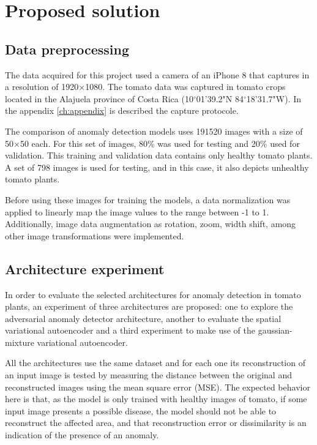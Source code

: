 \chapter{Proposed solution}
\label{ch:solution}

\section{Data preprocessing}

The data acquired for this project used a camera of an iPhone 8 that captures in a resolution of 1920$\times$1080. The tomato data was captured in tomato crops located in the Alajuela province of Costa Rica (10$^{\circ}$01'39.2"N 84$^{\circ}$18'31.7"W). In the appendix \ref{ch:appendix} is described the capture protocole.

The comparison of anomaly detection models uses 191520 images with a size of 50$\times$50 each. For this set of images, 80\% was used for testing and 20\% used for validation. This training and validation data contains only healthy tomato plants. A set of 798 images is used for testing, and in this case, it also depicts unhealthy tomato plants.

Before using these images for training the models, a data normalization was applied to linearly map the image values to the range between -1 to 1. Additionally, image data augmentation as rotation, zoom, width shift, among other image transformations were implemented.

\section{Architecture experiment}

In order to evaluate the selected architectures for anomaly detection in tomato plants, an experiment of three architectures are proposed: one to explore the adversarial anomaly detector architecture, another to evaluate the spatial variational autoencoder and a third experiment to make use of the gaussian-mixture variational autoencoder.

All the architectures use the same dataset and for each one its reconstruction of an input image is tested by measuring the distance between the original and reconstructed images using the mean square error (MSE). The expected behavior here is that, as the model is only trained with healthy images of tomato, if some input image presents a possible disease, the model should not be able to reconstruct the affected area, and that reconstruction error or dissimilarity is an indication of the presence of an anomaly.

